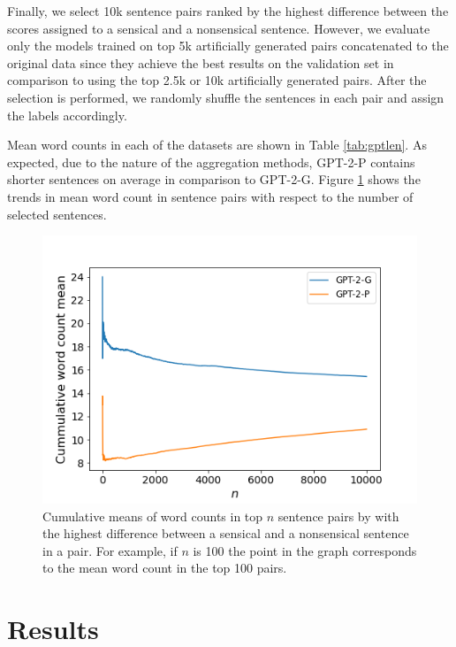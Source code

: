 \documentclass[10pt, a4paper]{article}
\begin{document}
Finally, we select 10k sentence pairs ranked by the highest difference between the scores assigned to a sensical and a nonsensical sentence. However, we evaluate only the models trained on top 5k artificially generated pairs concatenated to the original data since they achieve the best results on the validation set in comparison to using the top 2.5k or 10k artificially generated pairs. After the selection is performed, we randomly shuffle the sentences in each pair and assign the labels accordingly. 

Mean word counts in each of the datasets are shown in Table \ref{tab:gptlen}. As expected, due to the nature of the aggregation methods, GPT-2-P contains shorter sentences on average in comparison to GPT-2-G. Figure \ref{fig:cum} shows the trends in mean word count in sentence pairs with respect to the number of selected sentences.

\begin{figure}
    \centering
    \includegraphics[width=\columnwidth]{images/cummean (2).png}
    \caption{Cumulative means of word counts in top $n$ sentence pairs by with the highest difference between a sensical and a nonsensical sentence in a pair. For example, if $n$ is 100 the point in the graph corresponds to the mean word count in the top 100 pairs.}
    \label{fig:cum}
\end{figure}

\section{Results}
\label{results}
\end{document}
